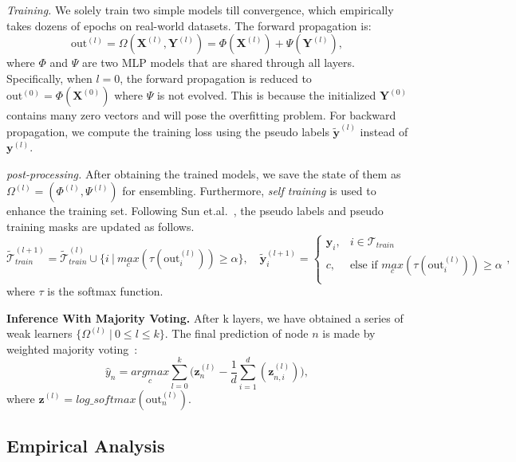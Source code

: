 \message{ !name(main.tex)}\documentclass{article}
\newcommand{\bm}[1]{\mathbf{#1}}
\begin{document}
\textit{Training.} We solely train two simple models till convergence, which empirically takes dozens of epochs on real-world datasets. The forward propagation is:
\begin{equation}
	\text{out}^{(l)} = \Omega(\bm{X}^{(l)},\bm{Y}^{(l)}) = \Phi(\bm{X}^{(l)}) + \Psi(\bm{Y}^{(l)}),
\end{equation}
where \(\Phi\) and \(\Psi\) are two MLP models that are shared through all layers. Specifically, when \(l=0\), the forward propagation is reduced to \(\text{out}^{(0)}=\Phi(\bm{X}^{(0)})\) where \(\Psi\) is not evolved. This is because the initialized \(\bm{Y}^{(0)}\) contains many zero vectors and will pose the overfitting problem. For backward propagation, we compute the training loss using the pseudo labels \(\tilde{\bm{y}}^{(l)}\) instead of \(\bm{y}^{(l)}\).

\textit{post-processing.} After obtaining the trained models, we save the state of them as \(\Omega^{(l)} = (\Phi^{(l)}, \Psi^{(l)})\) for ensembling. Furthermore, \textit{self training} is used to enhance the training set. Following Sun et.al.~\cite{sun2021scalable}, the pseudo labels and pseudo training masks are updated as follows.
\begin{equation}
	\widetilde{\mathcal{T}}^{(l+1)}_{train} = \widetilde{\mathcal{T}}^{(l)}_{train}\cup \{i\ |\  \underset{c}{max}(\tau(\text{out}^{(l)}_{i}))\ge\alpha\}, \quad
	\tilde{\bm{y}}^{(l+1)}_{i} = \begin{cases}
		\bm{y}_{i}, & i \in \mathcal{T}_{train}                                                \\
		c,          & \text{else if } \underset{c}{max}(\tau(\text{out}^{(l)}_{i})) \ge \alpha \\
	\end{cases},
\end{equation}
where \(\tau\) is the softmax function.

\textbf{Inference With Majority Voting.} After k layers, we have obtained a series of weak learners \(\{ \Omega^{(l)} \ |\ 0 \le l \le k\}\). The final prediction of node \(n\) is made by weighted majority voting~\cite{hastie2009multi}:
\begin{equation}
	\hat{y}_{n} = \underset{c}{argmax}\sum_{l=0}^{k}\bigg(\bm{z}_{n}^{(l)}-\frac{1}{d}\sum_{i=1}^{d}(\bm{z}_{n,i}^{(l)})\bigg),
\end{equation}
where \(\bm{z}^{(l)}=log\_softmax(\text{out}^{(l)}_{n})\).

\subsection{Empirical Analysis}
\end{document}

